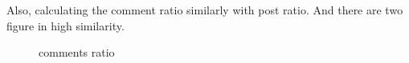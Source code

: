 \documentclass[A4paper,twoside,twocolumn]{article}
\begin{document}
Also, calculating the comment ratio similarly with post ratio. And there are two figure in high similarity.
 \begin{figure}[H]
 		\centering 
	\caption{comments ratio}
	\label{fig} 

  	\end{figure}
\end{document}
